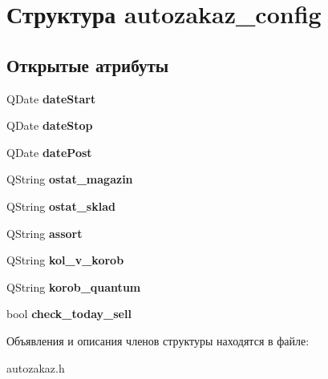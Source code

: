 \hypertarget{structautozakaz__config}{\section{Структура autozakaz\-\_\-config}
\label{structautozakaz__config}
}
\subsection*{Открытые атрибуты}
\begin{DoxyCompactItemize}
\item 
\hypertarget{structautozakaz__config_aaf37b9b7d17db3362e7b80f442bef51d}{\-Q\-Date {\bfseries date\-Start}}\label{structautozakaz__config_aaf37b9b7d17db3362e7b80f442bef51d}

\item 
\hypertarget{structautozakaz__config_a5dd4731ab76dbf2dbec0f9788bc2a444}{\-Q\-Date {\bfseries date\-Stop}}\label{structautozakaz__config_a5dd4731ab76dbf2dbec0f9788bc2a444}

\item 
\hypertarget{structautozakaz__config_a65b98bfe327d02bea7e31ecdfc8edd21}{\-Q\-Date {\bfseries date\-Post}}\label{structautozakaz__config_a65b98bfe327d02bea7e31ecdfc8edd21}

\item 
\hypertarget{structautozakaz__config_a3657264d9cd0ca717633d23934366593}{\-Q\-String {\bfseries ostat\-\_\-magazin}}\label{structautozakaz__config_a3657264d9cd0ca717633d23934366593}

\item 
\hypertarget{structautozakaz__config_a6184ac3ce0ff828f7dec25c49801b252}{\-Q\-String {\bfseries ostat\-\_\-sklad}}\label{structautozakaz__config_a6184ac3ce0ff828f7dec25c49801b252}

\item 
\hypertarget{structautozakaz__config_ac290e66a1c36f531e56325ecd9efc37f}{\-Q\-String {\bfseries assort}}\label{structautozakaz__config_ac290e66a1c36f531e56325ecd9efc37f}

\item 
\hypertarget{structautozakaz__config_a69684f475925ae62b8f2f86e6661adfb}{\-Q\-String {\bfseries kol\-\_\-v\-\_\-korob}}\label{structautozakaz__config_a69684f475925ae62b8f2f86e6661adfb}

\item 
\hypertarget{structautozakaz__config_a91230cc98786ee2cb908f40e29f49786}{\-Q\-String {\bfseries korob\-\_\-quantum}}\label{structautozakaz__config_a91230cc98786ee2cb908f40e29f49786}

\item 
\hypertarget{structautozakaz__config_a055f0b819d9b69f8d8725652167c2e64}{bool {\bfseries check\-\_\-today\-\_\-sell}}\label{structautozakaz__config_a055f0b819d9b69f8d8725652167c2e64}

\end{DoxyCompactItemize}


Объявления и описания членов структуры находятся в файле\-:\begin{DoxyCompactItemize}
\item 
autozakaz.\-h\end{DoxyCompactItemize}
